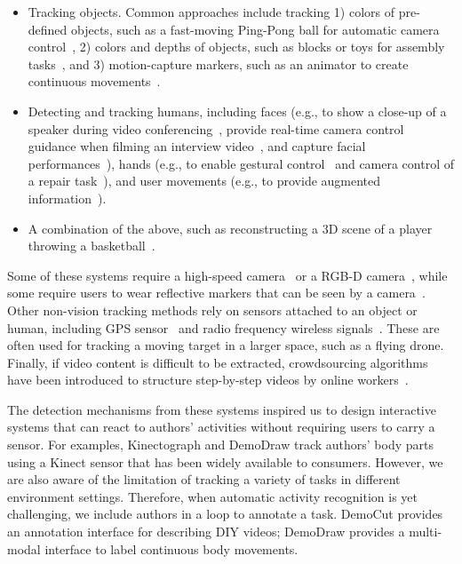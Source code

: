 \begin{itemize}
  \item Tracking objects. Common approaches include tracking 1) colors of pre-defined objects, such as a fast-moving Ping-Pong ball for automatic camera control~\cite{Okumura:2011tr}, 2) colors and depths of objects, such as blocks or toys for assembly tasks~\cite{Gupta:2012ku,Wu:2016:ARI:2856400.2856416}, and 3) motion-capture markers, such as an animator to create continuous movements~\cite{Dontcheva:2003:LAC:1201775.882285}.
  \item Detecting and tracking humans, including faces (e.g., to show a close-up of a speaker during video conferencing~\cite{Ranjan:2010}, provide real-time camera control guidance when filming an interview video~\cite{Carter:2010}, and capture facial performances~\cite{Shi:2014:AAH:2661229.2661290,thies2016face}), hands (e.g., to enable gestural control~\cite{taylor-siggraph2016} and camera control of a repair task~\cite{Ranjan:2008}), and user movements (e.g., to provide augmented information~\cite{Wilson:2012fb,Anderson:2013:YEM:2501988.2502045}).
  \item A combination of the above, such as reconstructing a 3D scene of a player throwing a basketball~\cite{dou-siggraph2016}.
\end{itemize}

Some of these systems require a high-speed camera~\cite{Okumura:2011tr} or a RGB-D camera~\cite{Gupta:2012ku,Wu:2016:ARI:2856400.2856416,Wilson:2012fb,Anderson:2013:YEM:2501988.2502045,dou-siggraph2016}, while some require users to wear reflective markers that can be seen by a camera~\cite{Ranjan:2008}.
%
Other non-vision tracking methods rely on sensors attached to an object or human, including GPS sensor~\cite{HexoDrone} and radio frequency wireless signals~\cite{Nguyen:2016:ICR:2935620.2935632}. These are often used for tracking a moving target in a larger space, such as a flying drone.
%
Finally, if video content is difficult to be extracted, crowdsourcing algorithms have been introduced to structure step-by-step videos by online workers~\cite{Kim:2014:CSI:2611222.2556986}.

The detection mechanisms from these systems inspired us to design interactive systems that can react to authors' activities without requiring users to carry  a sensor. For examples, Kinectograph and DemoDraw track authors' body parts using a Kinect sensor that has been widely available to consumers. However, we are also aware of the limitation of tracking a variety of tasks in different environment settings. Therefore, when automatic activity recognition is yet challenging, we include authors in a loop to annotate a task. DemoCut provides an annotation interface for describing DIY videos; DemoDraw provides a multi-modal interface to label continuous body movements.

